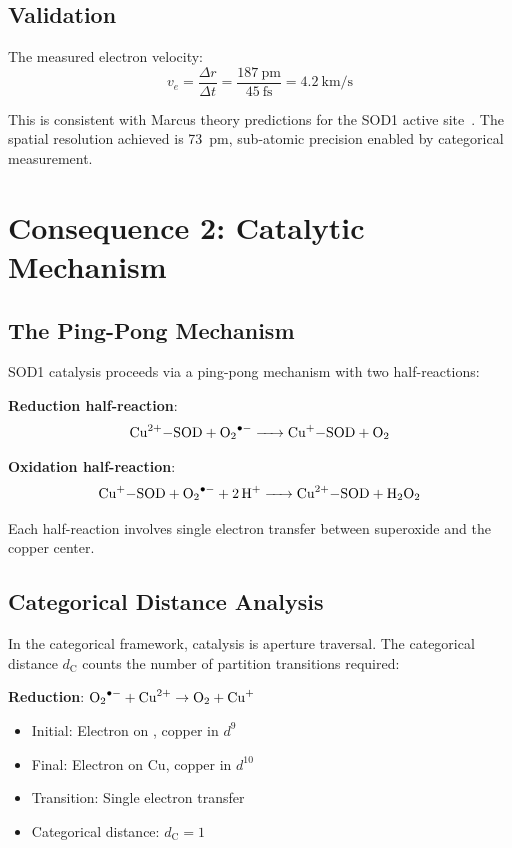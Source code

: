 \documentclass[twocolumn,aps,prx,superscriptaddress,longbibliography]{revtex4-2}
\theoremstyle{remark}
\newcommand{\dC}{d_\text{C}}
\begin{document}
\subsection{Validation}

The measured electron velocity:
\begin{equation}
v_e = \frac{\Delta r}{\Delta t} = \frac{187~\text{pm}}{45~\text{fs}} = 4.2~\text{km/s}
\end{equation}

This is consistent with Marcus theory predictions for the SOD1 active
site~\cite{Gray2003}. The spatial resolution achieved is 73~pm,
sub-atomic precision enabled by categorical measurement.

\section{Consequence 2: Catalytic Mechanism}
\label{sec:catalysis}

\subsection{The Ping-Pong Mechanism}

SOD1 catalysis proceeds via a ping-pong mechanism with two half-reactions:

\textbf{Reduction half-reaction}:
\begin{equation}
\ce{Cu^{2+}-SOD + O2^{.-} -> Cu^{+}-SOD + O2}
\label{eq:reduction}
\end{equation}

\textbf{Oxidation half-reaction}:
\begin{equation}
\ce{Cu^{+}-SOD + O2^{.-} + 2H^+ -> Cu^{2+}-SOD + H2O2}
\label{eq:oxidation}
\end{equation}

Each half-reaction involves single electron transfer between superoxide
and the copper center.

\subsection{Categorical Distance Analysis}

In the categorical framework, catalysis is aperture traversal. The
categorical distance $\dC$ counts the number of partition transitions
required:

\textbf{Reduction}: $\ce{O2^{.-}} + \ce{Cu^{2+}} \to \ce{O2} + \ce{Cu^{+}}$
\begin{itemize}
    \item Initial: Electron on , copper in $d^9$
    \item Final: Electron on Cu, copper in $d^{10}$
    \item Transition: Single electron transfer
    \item Categorical distance: $\dC = 1$
\end{itemize}
\end{document}
